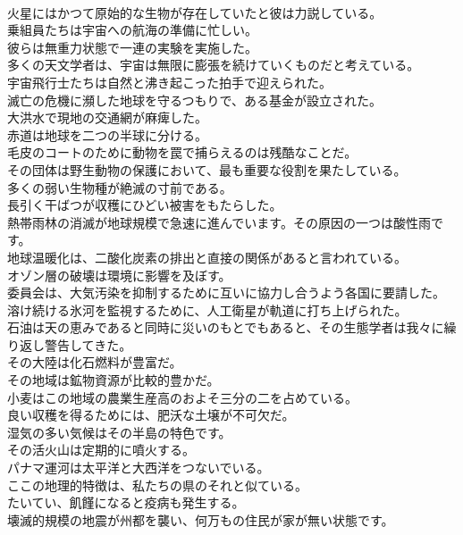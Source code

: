 \documentclass[8pt]{extreport}
\begin{document}
\begin{CJK}{UTF8}{min}
\\	火星にはかつて原始的な生物が存在していたと彼は力説している。
\\	乗組員たちは宇宙への航海の準備に忙しい。
\\	彼らは無重力状態で一連の実験を実施した。
\\	多くの天文学者は、宇宙は無限に膨張を続けていくものだと考えている。
\\	宇宙飛行士たちは自然と沸き起こった拍手で迎えられた。
\\	滅亡の危機に瀕した地球を守るつもりで、ある基金が設立された。
\\	大洪水で現地の交通網が麻痺した。
\\	赤道は地球を二つの半球に分ける。
\\	毛皮のコートのために動物を罠で捕らえるのは残酷なことだ。
\\	その団体は野生動物の保護において、最も重要な役割を果たしている。
\\	多くの弱い生物種が絶滅の寸前である。
\\	長引く干ばつが収穫にひどい被害をもたらした。
\\	熱帯雨林の消滅が地球規模で急速に進んでいます。その原因の一つは酸性雨です。
\\	地球温暖化は、二酸化炭素の排出と直接の関係があると言われている。
\\	オゾン層の破壊は環境に影響を及ぼす。
\\	委員会は、大気汚染を抑制するために互いに協力し合うよう各国に要請した。
\\	溶け続ける氷河を監視するために、人工衛星が軌道に打ち上げられた。
\\	石油は天の恵みであると同時に災いのもとでもあると、その生態学者は我々に繰り返し警告してきた。
\\	その大陸は化石燃料が豊富だ。
\\	その地域は鉱物資源が比較的豊かだ。
\\	小麦はこの地域の農業生産高のおよそ三分の二を占めている。
\\	良い収穫を得るためには、肥沃な土壌が不可欠だ。
\\	湿気の多い気候はその半島の特色です。
\\	その活火山は定期的に噴火する。
\\	パナマ運河は太平洋と大西洋をつないでいる。
\\	ここの地理的特徴は、私たちの県のそれと似ている。
\\	たいてい、飢饉になると疫病も発生する。
\\	壊滅的規模の地震が州都を襲い、何万もの住民が家が無い状態です。

\end{CJK}
\end{document}
